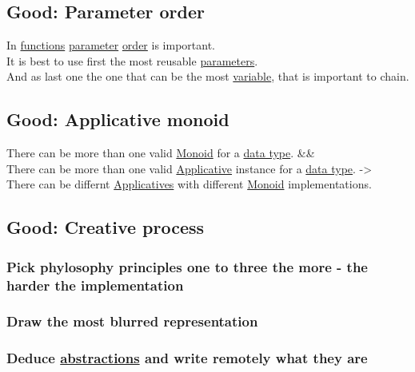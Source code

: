 \documentclass[11pt]{article}
\begin{document}
\subsection{\label{orge399ab5}Good: Parameter order}
\label{sec:orgf80e892}
In \hyperref[orgaa8fb87]{functions} \hyperref[org0e7674e]{parameter} \hyperref[orgc0a359b]{order} is important.\\
It is best to use first the most reusable \hyperref[orgcafb058]{parameters}.\\
And as last one the one that can be the most \hyperref[org0b57594]{variable}, that is important to chain.\\

\subsection{\label{org8bc3506}Good: Applicative monoid}
\label{sec:org551cb46}
There can be more than one valid \hyperref[org37d140b]{Monoid} for a \hyperref[org212d9c3]{data type}. \&\&\\
There can be more than one valid \hyperref[org2dfdf4a]{Applicative} instance for a \hyperref[org212d9c3]{data type}. ->\\
There can be differnt \hyperref[org11fa8ed]{Applicatives} with different \hyperref[org37d140b]{Monoid} implementations.\\

\subsection{\label{org716ffc8}Good: Creative process}
\label{sec:org2c32cd8}
\subsubsection{Pick phylosophy principles one to three the more - the harder the implementation}
\label{sec:orgd3cb935}

\subsubsection{Draw the most blurred representation}
\label{sec:org8e8c312}

\subsubsection{Deduce \hyperref[orgc16d079]{abstractions} and write remotely what they are}
\label{sec:orgd4e129c}
\end{document}
